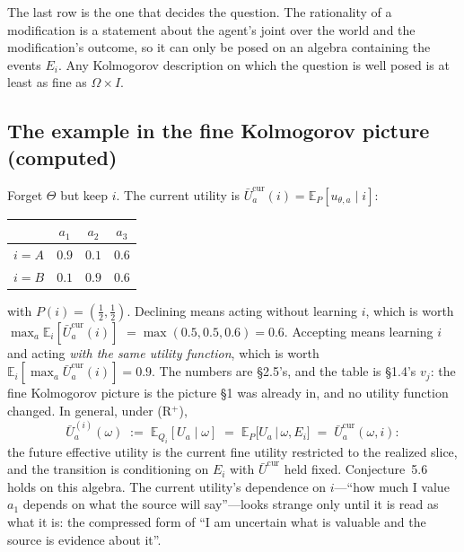 \documentclass[11pt,a4paper]{article}
\newcommand{\E}{\mathbb{E}}
\newcommand{\Ucur}{\bar U^{\mathrm{cur}}}
\begin{document}
The last row is the one that decides the question. The rationality of a modification is a statement about the agent's joint over the world and the modification's outcome, so it can only be posed on an algebra containing the events $E_i$. Any Kolmogorov description on which the question is well posed is at least as fine as $\Omega \times I$.

\subsection{The example in the fine Kolmogorov picture (computed)}
Forget $\Theta$ but keep $i$. The current utility is $\Ucur_a(i) = \E_P[u_{\theta, a} \mid i]$:
\begin{center}
\begin{tabular}{@{}lccc@{}}
\toprule
 & $a_1$ & $a_2$ & $a_3$ \\
\midrule
$i = A$ & $0.9$ & $0.1$ & $0.6$ \\
$i = B$ & $0.1$ & $0.9$ & $0.6$ \\
\bottomrule
\end{tabular}
\end{center}
with $P(i) = (\tfrac12, \tfrac12)$. Declining means acting without learning $i$, which is worth $\max_a \E_i[\Ucur_a(i)]$ $= \max(0.5, 0.5, 0.6) = 0.6$. Accepting means learning $i$ and acting \emph{with the same utility function}, which is worth $\E_i[\max_a \Ucur_a(i)] = 0.9$. The numbers are \S2.5's, and the table is \S1.4's $v_j$: the fine Kolmogorov picture is the picture \S1 was already in, and no utility function changed. In general, under (R$^+$),
\[
\bar U^{(i)}_a(\omega) \;:=\; \E_{Q_i}[U_a \mid \omega] \;=\; \E_P\bigl[U_a \,\big|\, \omega, E_i\bigr] \;=\; \Ucur_a(\omega, i):
\]
the future effective utility is the current fine utility restricted to the realized slice, and the transition is conditioning on $E_i$ with $\Ucur$ held fixed. Conjecture~5.6 holds on this algebra. The current utility's dependence on $i$---``how much I value $a_1$ depends on what the source will say''---looks strange only until it is read as what it is: the compressed form of ``I am uncertain what is valuable and the source is evidence about it''.
\end{document}
